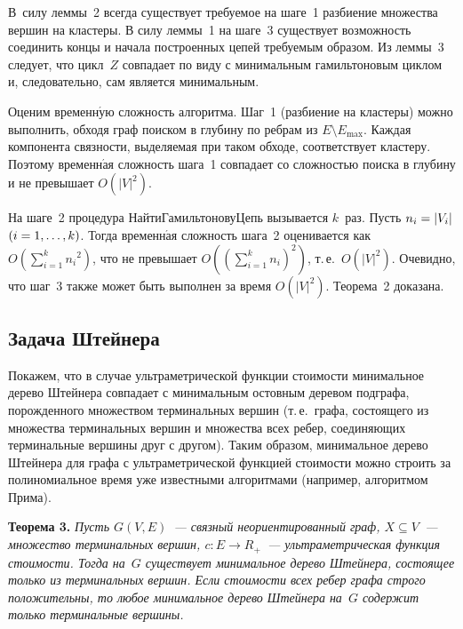 \begin{multicols}{2}
В~силу леммы~2 всегда существует требуемое на шаге~1 разбиение
множества вершин на кластеры. В силу леммы~1 на шаге~3 существует
возможность соединить концы и начала построенных цепей требуемым
образом. Из леммы~3 следует, что цикл~$Z$ совпадает по виду с
минимальным гамильтоновым циклом и, следовательно, сам является
минимальным.

Оценим временн$\acute{\mbox{у}}$ю сложность алгоритма.
Шаг~1 (разбиение на кластеры) можно выполнить, обходя граф поиском в
глубину по ребрам из $E \setminus E_{\max}$. Каждая компонента связности,
выделяемая при таком обходе, соответствует кластеру. Поэтому временн$\acute{\mbox{а}}$я сложность
шага~1 совпадает со сложностью поиска в глубину и не превышает $O(|V|^2)$.

На шаге~2 процедура {\sf НайтиГамильтоновуЦепь} вызывается $k$~раз.
Пусть $n_i \hm= |V_i|$ $(i\hm=1,\ldots,k)$.
Тогда временн$\acute{\mbox{а}}$я сложность шага~2 оценивается как
$O\left(\sum\limits_{i=1}^{k} {n_i}^2\right)$, что не превышает
$O\left(\left(\sum\limits_{i=1}^{k} {n_i}\right)^2\right)$, т.\,е.\ $O\left(|V|^2\right)$.
Очевидно, что шаг~3 также может быть выполнен за время $O(|V|^2)$.
Теорема~2 доказана.



\subsection{Задача Штейнера}


Покажем, что в случае ультраметрической функции стоимости минимальное дерево
Штейнера совпадает
с минимальным остовным деревом подграфа, порожденного множеством терминальных вершин
(т.\,е.\ графа, состоящего из множества терминальных вершин и множества всех ребер, соединяющих
терминальные вершины друг с другом). Таким образом, минимальное дерево Штейнера для графа с
ультраметрической функцией стои\-мости можно строить за полиномиальное время уже известными алгоритмами
(например, алгоритмом Прима).

\smallskip

\noindent
\textbf{Теорема 3. }
\textit{Пусть $G(V,E)$~--- связный неориентированный граф,
$X \subseteq V$~--- множество терминальных вершин,
$c: E \rightarrow R_{+}$~---  ультраметрическая функция стоимости.
Тогда на~$G$ существует минимальное дерево Штейнера, состоящее только
из терминальных вершин.
Если стоимости всех ребер графа строго положительны, то любое
минимальное дерево Штейнера на~$G$ содержит только терминальные вершины.}



\end{multicols}
